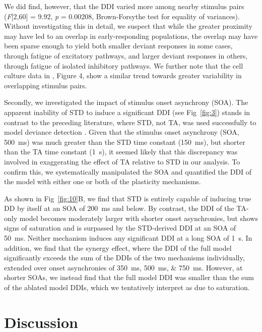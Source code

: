 \documentclass[10pt,letterpaper]{article}
\newcommand{\FIG}[1]{Fig~\ref{fig:#1}}
\newcommand{\statistic}[2]{\textit{#1} = \num{#2}}
\begin{document}
We did find, however, that the DDI varied more among nearby stimulus pairs (\textit{F}[2,60] = \num{9.92}, \statistic{p}{0.00208}, Brown-Forsythe test for equality of variances). Without investigating this in detail, we suspect that while the greater proximity may have led to an overlap in early-responding populations, the overlap may have been sparse enough to yield both smaller deviant responses in some cases, through fatigue of excitatory pathways, and larger deviant responses in others, through fatigue of isolated inhibitory pathways. We further note that the cell culture data in \cite{Kubota2021-dx}, Figure 4, show a similar trend towards greater variability in overlapping stimulus pairs.

Secondly, we investigated the impact of stimulus onset asynchrony (SOA). The apparent inability of STD to induce a significant DDI (see \FIG{3}) stands in contrast to the preceding literature, where STD, not TA, was used successfully to model deviance detection \cite{Mill2011-ah, May2015-lt, Yarden2017-eh}. Given that the stimulus onset asynchrony (SOA, \qty{500}{\milli\second}) was much greater than the STD time constant (\qty{150}{\milli\second}), but shorter than the TA time constant (\qty{1}{\second}), it seemed likely that this discrepancy was involved in exaggerating the effect of TA relative to STD in our analysis. To confirm this, we systematically manipulated the SOA and quantified the DDI of the model with either one or both of the plasticity mechanisms.

As shown in \FIG{10}B, we find that STD is entirely capable of inducing true DD by itself at an SOA of \qty{200}{\milli\second} and below. By contrast, the DDI of the TA-only model becomes moderately larger with shorter onset asynchronies, but shows signs of saturation and is surpassed by the STD-derived DDI at an SOA of \qty{50}{\milli\second}. Neither mechanism induces any significant DDI at a long SOA of \qty{1}{\second}. In addition, we find that the synergy effect, where the DDI of the full model significantly exceeds the sum of the DDIs of the two mechanisms individually, extended over onset asynchronies of \qtylist{350;500;750}{\milli\second}. However, at shorter SOAs, we instead find that the full model DDI was smaller than the sum of the ablated model DDIs, which we tentatively interpret as due to saturation.

\section*{Discussion}
\end{document}
